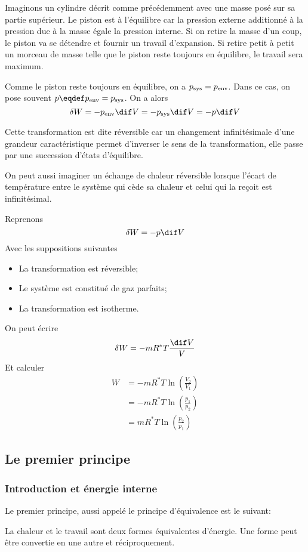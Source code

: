Imaginons un cylindre décrit comme précédemment
avec une masse posé sur sa partie supérieur.
Le piston est à l'équilibre car la pression externe
additionné à la pression due à la masse égale la pression interne.
Si on retire la masse d'un coup,
le piston va se détendre et fournir un travail d'expansion.
Si retire petit à petit un morceau de masse telle
que le piston reste toujours en équilibre, le travail sera maximum.

Comme le piston reste toujours en équilibre, on a $p_{\mathrm{sys}} = p_{\mathrm{env}}$.
Dans ce cas, on pose souvent $p \eqdef \penv = \psys$.
On a alors
\[ \delta W = -\penv \dif V = -\psys \dif V = -p \dif V \]

Cette transformation est dite réversible car un changement infinitésimale
d'une grandeur caractéristique permet d'inverser le sens de la transformation,
elle passe par une succession d'états d'équilibre.

On peut aussi imaginer un échange de chaleur réversible lorsque
l'écart de température entre le système qui cède sa chaleur et
celui qui la reçoit est infinitésimal.

Reprenons
\[ \delta W = -p\dif V \]
Avec les suppositions suivantes
\begin{itemize}
  \item La transformation est réversible;
  \item Le système est constitué de gaz parfaits;
  \item La transformation est isotherme.
\end{itemize}
On peut écrire
\[ \delta W = -mR^*T\frac{\dif V}V \]
Et calculer
\begin{align*}
  W & = -mR^*T \ln\left(\frac{V_2}{V_1}\right)\\
    & = -mR^*T \ln\left(\frac{p_1}{p_2}\right)\\
    & = mR^*T \ln\left(\frac{p_2}{p_1}\right)
\end{align*}

\subsection{Le premier principe}
\subsubsection{Introduction et énergie interne}
Le premier principe, aussi appelé le principe d'équivalence est le suivant:

La chaleur et le travail sont deux formes équivalentes d'énergie.
Une forme peut être convertie en une autre et réciproquement.

